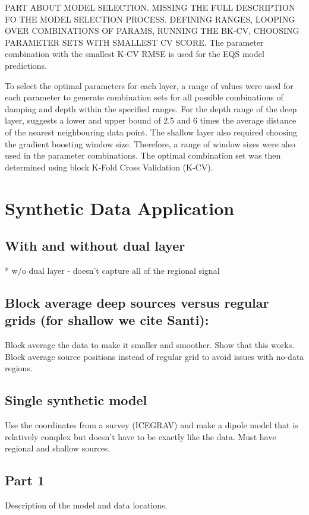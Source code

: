 PART ABOUT MODEL SELECTION. MISSING THE FULL DESCRIPTION FO THE MODEL SELECTION PROCESS. DEFINING RANGES, LOOPING OVER COMBINATIONS OF PARAMS, RUNNING THE BK-CV, CHOOSING PARAMETER SETS WITH SMALLEST CV SCORE.
The parameter combination with the smallest K-CV RMSE is used for the EQS model predictions.

To select the optimal parameters for each layer, a range of values were used for each parameter to generate combination sets for all possible combinations of damping and depth within the specified ranges. 
For the depth range of the deep layer, \citet{Dampney1969} suggests a lower and upper bound of 2.5 and 6 times the average distance of the nearest neighbouring data point.
The shallow layer also required choosing the gradient boosting window size. Therefore, a range of window sizes were also used in the parameter combinations. The optimal combination set was then determined using block K-Fold Cross Validation (K-CV). 

\section{Synthetic Data Application}

\subsection{With and without dual layer}
* w/o dual layer - doesn't capture all of the regional signal

\subsection{Block average deep sources versus regular grids (for shallow we cite Santi):}
Block average the data to make it smaller and smoother. Show that this works.
Block average source positions instead of regular grid to avoid issues with no-data regions.

\subsection{Single synthetic model}
Use the coordinates from a survey (ICEGRAV) and make a dipole model that is relatively complex but doesn't have to be exactly like the data. Must have regional and shallow sources.


\subsection{Part 1}
Description of the model and data locations.

